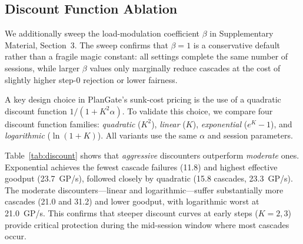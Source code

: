 \documentclass[sigconf,review,anonymous]{acmart}
\begin{document}
\subsection{Discount Function Ablation}
We additionally sweep the load-modulation coefficient $\beta$ in Supplementary Material, Section~3. The sweep confirms that $\beta{=}1$ is a conservative default rather than a fragile magic constant: all settings complete the same number of sessions, while larger $\beta$ values only marginally reduce cascades at the cost of slightly higher step-0 rejection or lower fairness.
\label{sec:discountablation}

A key design choice in PlanGate's sunk-cost pricing is the use of a quadratic discount function $1/(1+K^2\alpha)$. To validate this choice, we compare four discount function families: \emph{quadratic} ($K^2$), \emph{linear} ($K$), \emph{exponential} ($e^{K}-1$), and \emph{logarithmic} ($\ln(1+K)$). All variants use the same $\alpha$ and session parameters.

\begin{table}[t]
\caption{Discount function ablation (500 sessions, pure ReAct mode \texttt{ps\_ratio=0.0}, averaged over 5 runs). All functions achieve identical success (30), but differ substantially in cascade protection and goodput.}
\label{tab:discount}
\small
{}
\end{table}

Table~\ref{tab:discount} shows that \emph{aggressive} discounters outperform \emph{moderate} ones. Exponential achieves the fewest cascade failures (11.8) and highest effective goodput (23.7~GP/s), followed closely by quadratic (15.8 cascades, 23.3~GP/s). The moderate discounters---linear and logarithmic---suffer substantially more cascades (21.0 and 31.2) and lower goodput, with logarithmic worst at 21.0~GP/s. This confirms that steeper discount curves at early steps ($K{=}2,3$) provide critical protection during the mid-session window where most cascades occur.
\end{document}
